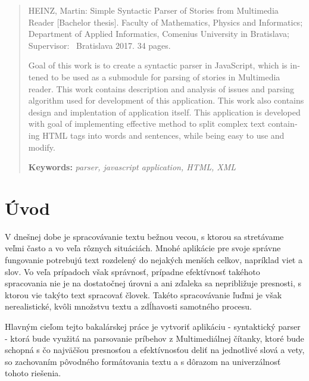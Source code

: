 \documentclass[12pt,a4paper]{report}
\theoremstyle{definition}
\theoremstyle{remark}
\begin{document}
\begin{otherlanguage}{english}
\begin{abstract}

HEINZ, Martin: Simple Syntactic Parser of Stories from Multimedia Reader [Bachelor thesis]. Faculty of Mathematics, Physics and Informatics;
Department of Applied Informatics, Comenius University in Bratislava; Supervisor: \skolitel \ Bratislava 2017. 34 pages.


\bigskip

Goal of this work is to create a syntactic parser in JavaScript, which is intened to be used as a submodule for parsing of stories in Multimedia reader. This work contains description and analysis of issues and parsing algorithm used for development of this application. This work also contains design and implentation of application itself. This application is developed with goal of implementing effective method to split complex text containing HTML tags into words and sentences, while being easy to use and modify.

\bigskip\noindent
\textbf{Keywords:} \textit{parser, javascript application, HTML, XML} 



\end{abstract}
\end{otherlanguage}
\cleardoublepage
{}
\setcounter{tocdepth}{1}
\tableofcontents
\cleardoublepage
{}

\chapter*{Úvod}
V dnešnej dobe je spracovávanie textu bežnou vecou, s ktorou sa stretávame veľmi často a vo veľa rôznych situáciách. Mnohé aplikácie pre svoje správne fungovanie potrebujú text rozdelený do nejakých menších celkov, napríklad viet a slov. Vo veľa prípadoch však správnosť, prípadne efektívnosť takéhoto spracovania nie je na dostatočnej úrovni a ani zďaleka sa nepribližuje presnosti, s ktorou vie takýto text spracovať človek. Takéto spracovávanie ľuďmi je však nerealistické, kvôli množstvu textu a zdĺhavosti samotného procesu.
\bigskip


Hlavným cieľom tejto bakalárskej práce je vytvoriť aplikáciu  - syntaktický parser - ktorá bude využitá na parsovanie príbehov z Multimediálnej čítanky, ktoré bude schopná s čo najväčšou presnosťou a efektívnosťou deliť na jednotlivé slová a vety, so zachovaním pôvodného formátovania textu a s dôrazom na univerzálnosť tohoto riešenia.
\bigskip
\end{document}
